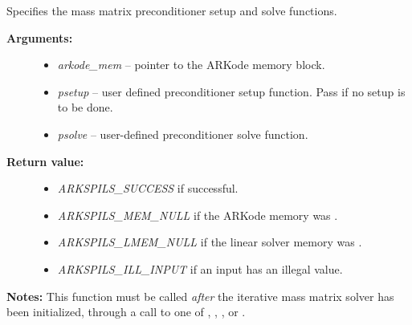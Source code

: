 \documentclass[letterpaper,10pt,english]{sphinxmanual}
\begin{document}

\begin{fulllineitems}
\label{c_interface/User_callable:ARKSpilsSetMassPreconditioner}
Specifies the mass matrix preconditioner setup and solve functions.
\begin{description}
\item[{\textbf{Arguments:}}] \leavevmode\begin{itemize}
\item {} 
\emph{arkode\_mem} -- pointer to the ARKode memory block.

\item {} 
\emph{psetup} -- user defined preconditioner setup function.  Pass
 if no setup is to be done.

\item {} 
\emph{psolve} -- user-defined preconditioner solve function.

\end{itemize}

\item[{\textbf{Return value:}}] \leavevmode\begin{itemize}
\item {} 
\emph{ARKSPILS\_SUCCESS} if successful.

\item {} 
\emph{ARKSPILS\_MEM\_NULL} if the ARKode memory was .

\item {} 
\emph{ARKSPILS\_LMEM\_NULL} if the linear solver memory was .

\item {} 
\emph{ARKSPILS\_ILL\_INPUT} if an input has an illegal value.

\end{itemize}

\end{description}

\textbf{Notes:} This function must be called \emph{after} the iterative mass
matrix solver has been initialized, through a call to one of
{\hyperref[c_interface/User_callable:ARKMassSpgmr]{}}, {\hyperref[c_interface/User_callable:ARKMassSpbcg]{}},
{\hyperref[c_interface/User_callable:ARKMassSptfqmr]{}}, {\hyperref[c_interface/User_callable:ARKMassSpfgmr]{}} or
{\hyperref[c_interface/User_callable:ARKMassPcg]{}}.


\end{fulllineitems}
\end{document}
